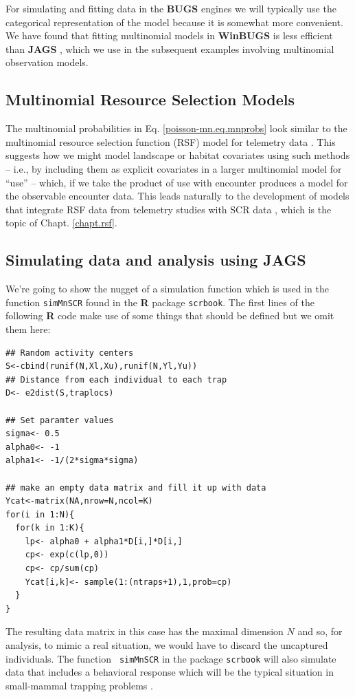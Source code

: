 For simulating and fitting data in the {\bf BUGS} engines we will
typically use the categorical representation of the model because it
is somewhat more convenient.  We have found that fitting multinomial
models in {\bf WinBUGS} is less efficient than {\bf JAGS}
\citep{converse_royle:2013}, which we use in the subsequent examples
involving multinomial observation models.


\subsection{Multinomial  Resource Selection Models}

The multinomial probabilities in Eq. \ref{poisson-mn.eq.mnprobs}
look similar to the 
multinomial resource selection function (RSF) model for telemetry data
\citep{manly_etal:2002, lele_keim:2006}.  This suggests how we might
model landscape or habitat covariates using such methods -- i.e., by
including them as explicit covariates in a larger multinomial model
for ``use'' -- which, if we take the product of use with encounter
produces a model for the observable encounter data. This 
leads naturally to the development of models that integrate RSF data
from telemetry studies with SCR data \citep{royle_chandler:2012},
which is the topic of  Chapt. \ref{chapt.rsf}.





\subsection{Simulating data and analysis using JAGS}

We're going to show the nugget of a simulation function which is
used in the function \mbox{\tt simMnSCR} found in the {\bf R} package
\mbox{\tt scrbook}.  The first lines of the following {\bf R} code
make use of some things that should be defined but we omit them here:
{\small
\begin{verbatim}
## Random activity centers
S<-cbind(runif(N,Xl,Xu),runif(N,Yl,Yu))
## Distance from each individual to each trap
D<- e2dist(S,traplocs)

## Set paramter values
sigma<- 0.5
alpha0<- -1
alpha1<- -1/(2*sigma*sigma)

## make an empty data matrix and fill it up with data
Ycat<-matrix(NA,nrow=N,ncol=K)
for(i in 1:N){
  for(k in 1:K){
    lp<- alpha0 + alpha1*D[i,]*D[i,]
    cp<- exp(c(lp,0))
    cp<- cp/sum(cp)
    Ycat[i,k]<- sample(1:(ntraps+1),1,prob=cp)
  }
}
\end{verbatim}
} 
The resulting data matrix in this case has the maximal dimension $N$
and so, for analysis, to mimic a real situation, we would have to
discard the uncaptured individuals.  The function \mbox{\tt
  simMnSCR} in the package \mbox{\tt scrbook} will also simulate
data that includes a behavioral response
 which will be the
typical situation in small-mammal trapping problems
\citep[see][for details]{converse_royle:2012}.

